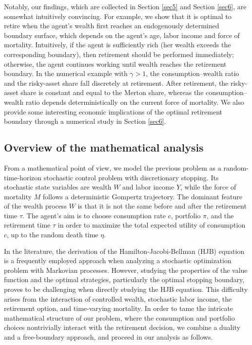 \documentclass[a4paper,11pt]{amsart}
\numberwithin{equation}{section}
\begin{document}
Notably, our findings, which are collected in Section \ref{sec5} and Section \ref{sec6}, are somewhat intuitively convincing. For example, we show that it is optimal to retire when the agent's wealth first reaches an endogenously determined boundary surface, which depends on the agent's age, labor income and force of mortality. Intuitively, if the agent is sufficiently rich (her wealth exceeds the corresponding boundary), then retirement should be performed immediately; otherwise, the agent continues working until wealth reaches the retirement boundary. {In the numerical example with $\gamma>1$, the consumption--wealth ratio and the risky-asset share fall discretely at retirement. After retirement, the risky-asset share is constant and equal to the Merton share, whereas the consumption--wealth ratio depends deterministically on the current force of mortality.}
 We also provide some interesting economic implications of the optimal retirement boundary through a numerical study in Section \ref{sec6}.

\vspace{-0.5\baselineskip}
\subsection{Overview of the mathematical analysis}
{From a mathematical point of view, we model the previous problem as a random-time-horizon stochastic control problem with discretionary stopping. Its stochastic state variables are wealth $W$ and labor income $Y$, while the force of mortality $M$ follows a deterministic Gompertz trajectory.} The dominant feature of the wealth process $W$ is that it is not the same before and after the retirement time $\tau$. The agent's aim is to choose consumption rate $c$, portfolio $\pi$, and the retirement time $\tau$ in order to maximize the total expected utility of consumption $c$, up to the random death time $\eta$.

In the literature, the derivation of the Hamilton-Jacobi-Bellman (HJB) equation is a frequently employed approach when analyzing {a} stochastic optimization problem with Markovian processes. %
However, studying the properties of the value function and the optimal strategies, particularly the optimal stopping boundary, proves to be challenging when directly studying the HJB equation. {This difficulty arises from the interaction of controlled wealth, stochastic labor income, the retirement option, and time-varying mortality.} In order to tame the intricate mathematical structure of our problem, where the consumption and portfolio choices nontrivially interact with the retirement decision, we combine a duality and a free-boundary approach, and proceed in our analysis as follows.
\end{document}
